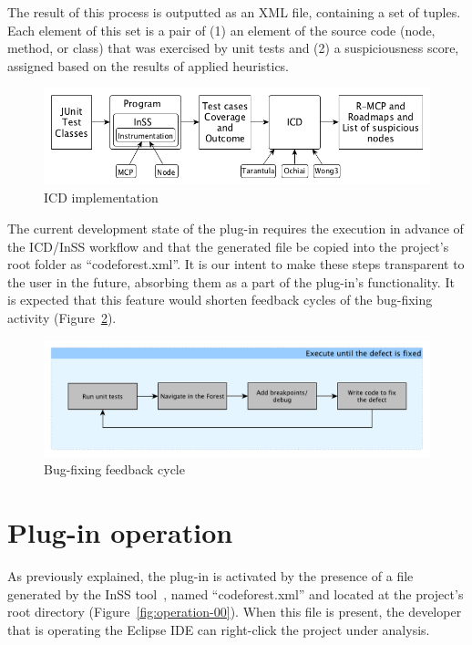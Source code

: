 The result of this process is outputted as an XML file, containing a set of
tuples. Each element of this set is a pair of (1) an element of the source code
(node, method, or class) that was exercised by unit tests and (2) a
suspiciousness score, assigned based on the results of applied heuristics.

\begin{figure}[h!]
\centering
\includegraphics[width=\textwidth]{figures/icd_implementation}
\caption{ICD implementation}
\label{fig:icd}
\end{figure}

The current development state of the plug-in requires the execution in advance
of the ICD/InSS workflow and that the generated file be copied into the
project's root folder as ``codeforest.xml''. It is our intent to make these steps
transparent to the user in the future, absorbing them as a part of the plug-in's
functionality. It is expected that this feature would shorten feedback cycles of
the bug-fixing activity (Figure~\ref{fig:feedback-cycle}).

\begin{figure}[h!] \centering
\centerline{\includegraphics[width=\linewidth]{figures/feedback-loop}}
\caption{Bug-fixing feedback cycle}\label{fig:feedback-cycle}
\end{figure}

\section{Plug-in operation}

As previously explained, the plug-in is activated by the presence of a file
generated by the InSS tool~\cite{souza2012depuracao}, named ``codeforest.xml''
and located at the project's root directory (Figure~\ref{fig:operation-00}).
When this file is present, the developer that is operating the Eclipse IDE can
right-click the project under analysis.


